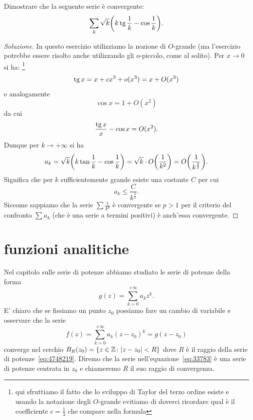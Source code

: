 \begin{exercise}
  Dimostrare che la seguente serie è convergente:
  \[
    \sum_k \sqrt{k} {\left( k\operatorname{tg}{\frac 1 k} - \cos \frac 1 k \right)}.
  \]
\end{exercise}
\begin{proof}[Soluzione]
In questo esercizio utilizziamo la nozione di $O$-grande (ma l'esercizio potrebbe essere risolto anche utilizzando gli $o$-piccolo, come al solito).
Per $x\to 0$ si ha: %
\footnote{%
qui sfruttiamo il fatto che lo sviluppo di Taylor del terzo ordine esiste 
e usando la notazione degli $O$-grande evitiamo di doverci ricordare qual è 
il coefficiente $c=\frac 1 3$ che compare nella formula}
\[
  \operatorname{tg} x = x + c x^3 + o(x^3) = x + O(x^3)
\]
e analogamente
\[
  \cos x = 1 + O(x^2)
\]
da cui
\[
  \frac{\operatorname{tg} x}{x} - \cos x = O(x^2).
\]
Dunque per $k\to +\infty$ si ha
\[
  a_k = \sqrt{k} {\left( k\tan{\frac 1 k} - \cos \frac 1 k \right)}
   = \sqrt{k} \cdot O{\left( \frac 1 {k^2} \right)} = O{\left( \frac 1 {k^{\frac 3 2}} \right)}.
\]
Significa che per $k$ sufficientemente grande esiste una costante $C$
per cui
\[
  a_k \le \frac{C}{k^{\frac 3 2}}.
\]
Siccome sappiamo che la serie $\sum \frac{1}{k^p}$ è convergente
se $p>1$ per il criterio del confronto $\sum a_k$ (che è una serie a termini positivi) è anch'essa convergente.
\end{proof}


\section{funzioni analitiche}


Nel capitolo sulle serie di potenze abbiamo studiato le serie di potenze
della forma
\begin{equation}\label{eq:4748219}
    g(z) = \sum_{k=0}^{+\infty} a_k z^k.
\end{equation}
E' chiaro che se fissiamo un punto $z_0$ possiamo fare un cambio di variabile
e osservare che la serie
\begin{equation}\label{eq:33783}
  f(z) = \sum_{k=0}^{+\infty} a_k (z-z_0)^k = g(z-z_0)
\end{equation}
converge nel cerchio $B_R(z_0) = {\left\{ z \in {\mathbb Z}\colon {\left|z-z_0\right|}< R \right\}}$
dove $R$ è il raggio della serie di potenze~\eqref{eq:4748219}.
Diremo che la serie nell'equazione~\eqref{eq:33783} è una
serie di potenze centrata in $z_0$ e chiameremo $R$ il suo raggio di convergenza.

